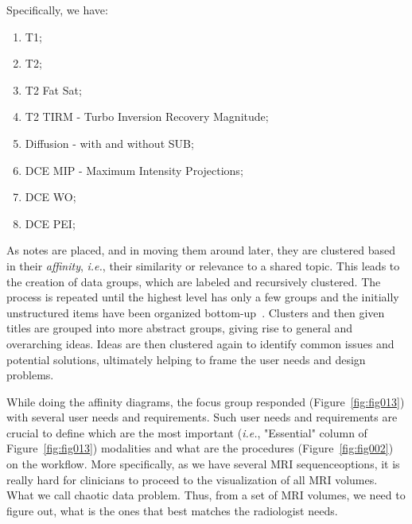 \hfill

\noindent
Specifically, we have:

\begin{multicols}{2}
\begin{enumerate}
\item T1;
\item T2;
\item T2 Fat Sat;
\item T2 TIRM - Turbo Inversion Recovery Magnitude;
\item Diffusion - with and without SUB;
\item DCE MIP - Maximum Intensity Projections;
\item DCE WO;
\item DCE PEI;
\end{enumerate}
\end{multicols}

\hfill

As notes are placed, and in moving them around later, they are clustered based in their {\it affinity}, {\it i.e.}, their similarity or relevance to a shared topic.
This leads to the creation of data groups, which are labeled and recursively clustered.
The process is repeated until the highest level has only a few groups and the initially unstructured items have been organized bottom-up~\cite{harrington2016affinity, 10.1145/3290605.3300628, 10.1145/3173574.3173704}.
Clusters and then given titles are grouped into more abstract groups, giving rise to general and overarching ideas.
Ideas are then clustered again to identify common issues and potential solutions, ultimately helping to frame the user needs and design problems.

While doing the affinity diagrams, the focus group responded (Figure~\ref{fig:fig013}) with several user needs and requirements.
Such user needs and requirements are crucial to define which are the most important ({\it i.e.}, "Essential" column of Figure~\ref{fig:fig013}) modalities and what are the procedures (Figure~\ref{fig:fig002}) on the workflow.
More specifically, as we have several MRI sequence\footnotemark[18] options, it is really hard for clinicians to proceed to the visualization of all MRI volumes.
What we call chaotic data problem.
Thus, from a set of MRI volumes, we need to figure out, what is the ones that best matches the radiologist needs.


